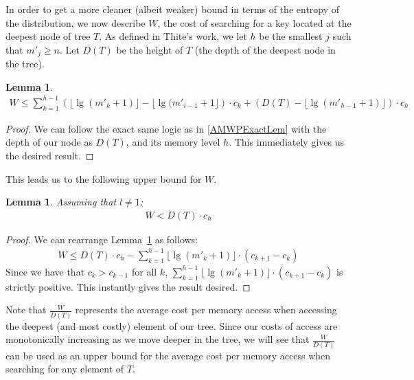 \documentclass[letterpaper,12pt,titlepage,oneside,final]{book}
\theoremstyle{plain}
\newtheorem{lem}[thm]{Lemma}
\begin{document}
In order to get a more cleaner (albeit weaker) bound in terms of the entropy of the distribution, we now describe $W$, the cost of searching for a key located at the deepest node of tree $T$. As defined in Thite's work, we let $h$ be the smallest $j$ such that $m'_j \geq n$. Let $D(T)$ be the height of $T$ (the depth of the deepest node in the tree).

\begin{lem} \label{452}
\begin{align*}
W \leq \sum_{k=1}^{h-1} \left(\lfloor \lg(m'_k+1) \rfloor - \lfloor \lg(m'_{i-1}+1 \rfloor  \right)\cdot c_k+ \left(D(T) - \lfloor \lg(m'_{h-1}+1) \rfloor \right)\cdot c_h
\end{align*}
\end{lem}


\begin{proof}
We can follow the exact same logic as in \ref{AMWPExactLem} with the depth of our node as $D(T)$, and its memory level $h$. This immediately gives us the desired result.

\end{proof}

This leads us to the following upper bound for $W$.

\begin{lem} \label{W<HT}
Assuming that $l \neq 1$:
\begin{align*}
W<D(T)\cdot c_h
\end{align*}
\end{lem}

\begin{proof}
We can rearrange Lemma~\ref{452} as follows:
\begin{align*}
W \leq D(T)\cdot c_h - \sum_{k=1}^{h-1} \lfloor \lg(m'_k+1) \rfloor \cdot(c_{k+1} - c_k) 
\end{align*}
Since we have that $c_k > c_{k-1}$ for all $k$, $\sum_{k=1}^{h-1} \lfloor \lg(m'_k+1) \rfloor \cdot(c_{k+1} - c_k)$ is strictly positive. This instantly gives the result desired.
\end{proof}

Note that $\frac{W}{D(T)}$ represents the average cost per memory access when accessing the deepest (and most costly) element of our tree. Since our costs of access are monotonically increasing as we move deeper in the tree, we will see that $\frac{W}{D(T)}$ can be used as an upper bound for the average cost per memory access when searching for any element of $T$.
\end{document}
